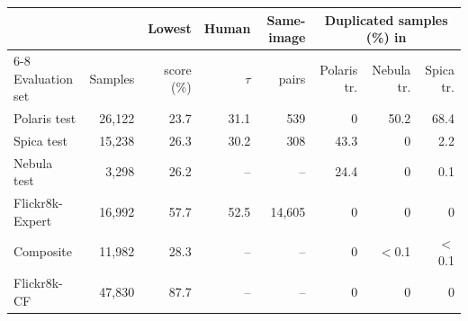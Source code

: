 \begin{tabular}{lrrrrrrr}
\toprule
& & Lowest & Human & Same-image & \multicolumn{3}{c}{Duplicated samples (\%) in} \\
\cmidrule(l){6-8}
Evaluation set & Samples & score (\%) & $\tau$ & pairs & Polaris tr. & Nebula tr. & Spica tr. \\
\midrule
Polaris test & 26,122 & 23.7 & 31.1 & 539 & 0 & 50.2 & 68.4 \\
Spica test & 15,238 & 26.3 & 30.2 & 308 & 43.3 & 0 & 2.2 \\
Nebula test & 3,298 & 26.2 & -- & -- & 24.4 & 0 & 0.1 \\
\addlinespace
Flickr8k-Expert & 16,992 & 57.7 & 52.5 & 14,605 & 0 & 0 & 0 \\
Composite & 11,982 & 28.3 & -- & -- & 0 & $<$0.1 & $<$0.1 \\
Flickr8k-CF & 47,830 & 87.7 & -- & -- & 0 & 0 & 0 \\
\bottomrule
\end{tabular}
